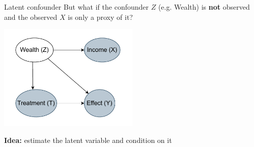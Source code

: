 \documentclass[10pt]{beamer}
\begin{document}
\begin{frame}{Latent confounder}
But what if the confounder $Z$ (e.g. Wealth) is \textbf{not} observed and the observed $X$ is only a proxy of it?
    \begin{center}
  \includegraphics[width=0.5\textwidth]{images/latent_confounder.pdf}
\end{center}
  
\textbf{Idea:} estimate the latent variable and condition on it

 \end{frame}
\end{document}
